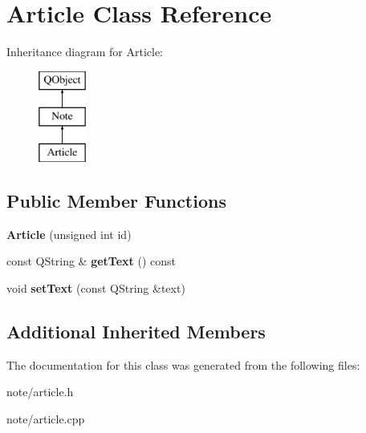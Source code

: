 \hypertarget{class_article}{\section{Article Class Reference}
\label{class_article}
}
Inheritance diagram for Article\-:\begin{figure}[H]
\begin{center}
\leavevmode
\includegraphics[height=3.000000cm]{class_article}
\end{center}
\end{figure}
\subsection*{Public Member Functions}
\begin{DoxyCompactItemize}
\item 
\hypertarget{class_article_aa60283ad9aa3854a7d402f088adf2a65}{{\bfseries Article} (unsigned int id)}\label{class_article_aa60283ad9aa3854a7d402f088adf2a65}

\item 
\hypertarget{class_article_a2f7505b72f339bcbc2fa7c387ab681f4}{const Q\-String \& {\bfseries get\-Text} () const }\label{class_article_a2f7505b72f339bcbc2fa7c387ab681f4}

\item 
\hypertarget{class_article_a860d31b831c031144cece4d334233246}{void {\bfseries set\-Text} (const Q\-String \&text)}\label{class_article_a860d31b831c031144cece4d334233246}

\end{DoxyCompactItemize}
\subsection*{Additional Inherited Members}


The documentation for this class was generated from the following files\-:\begin{DoxyCompactItemize}
\item 
note/article.\-h\item 
note/article.\-cpp\end{DoxyCompactItemize}
